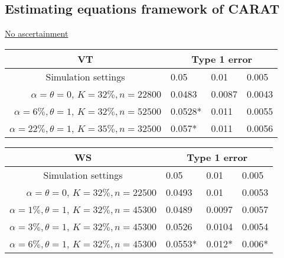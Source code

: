 \documentclass[11pt,a4paper]{article}
\begin{document}

\vspace{.4cm}
\subsection*{Estimating equations framework of CARAT} \underline{No ascertainment}

\begin{table}[ht]
\centering
\begin{tabular}{r|lll}
\multicolumn{1}{c|}{\bf VT}&\multicolumn{3}{c}{Type 1 error}\\
  \hline
\multicolumn{1}{c|}{Simulation settings} & 0.05 & 0.01 & 0.005 \\ 
  \hline
$\alpha = \theta = 0$, $K=32\%, n=22800$ &   0.0483& 0.0087 &0.0043 \\  %
$\alpha = 6\%, \theta = 1$, $K=32\%, n=52500$ &   0.0528*& 0.011 &0.0055 \\  %
$\alpha = 22\%, \theta = 1$, $K=35\%, n=32500$ &   0.057*& 0.011 &0.0056 \\ %
\end{tabular}
\end{table}

\vspace{.4cm}
\begin{table}[ht]
\centering
\begin{tabular}{r|lll}
\multicolumn{1}{c|}{\bf WS}&\multicolumn{3}{c}{Type 1 error}\\
  \hline
\multicolumn{1}{c|}{Simulation settings} & 0.05 & 0.01 & 0.005 \\ 
  \hline
$\alpha = \theta = 0$, $K=32\%, n=22500$ &   0.0493& 0.01 &0.0053 \\ %
$\alpha = 1\%, \theta = 1$, $K=32\%, n=45300$ &   0.0489& 0.0097 &0.0057 \\ %
$\alpha = 3\%, \theta = 1$, $K=32\%, n=45300$ &   0.0526& 0.0104 &0.0054 \\ %
$\alpha = 6\%, \theta = 1$, $K=32\%, n=45300$ &   0.0553*& 0.012* &0.006* \\ %
\end{tabular}
\end{table}
\end{document}
